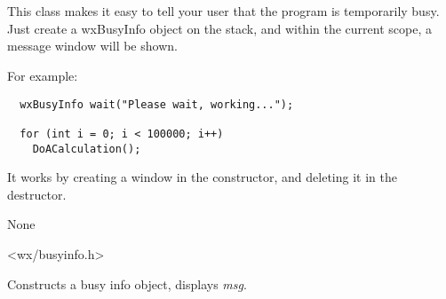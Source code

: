 \section{}\label{wxbusyinfo}

This class makes it easy to tell your user that the program is temporarily busy.
Just create a wxBusyInfo object on the stack, and within the current scope,
a message window will be shown.

For example:

\begin{verbatim}
  wxBusyInfo wait("Please wait, working...");

  for (int i = 0; i < 100000; i++)
    DoACalculation();
\end{verbatim}

It works by creating a window in the constructor,
and deleting it in the destructor.


None


<wx/busyinfo.h>




Constructs a busy info object, displays {\it msg}.

